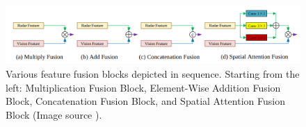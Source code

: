 \documentclass[report.tex]{subfiles}
\begin{document}
    \begin{figure}[h]
        \centering
        \includegraphics[width=1.0\textwidth]{images/methods/saf_fcos/different_fusion_blocks_for_feature_fusion.png}
        \caption{Various feature fusion blocks depicted in sequence. Starting from the left: Multiplication Fusion Block, Element-Wise Addition Fusion Block, Concatenation Fusion Block, and Spatial Attention Fusion Block (Image source \cite{chang2020spatial}).}
        \label{fig:saffcos_different_fusion_blocks_for_feature_fusion}
    \end{figure}



\end{document}
